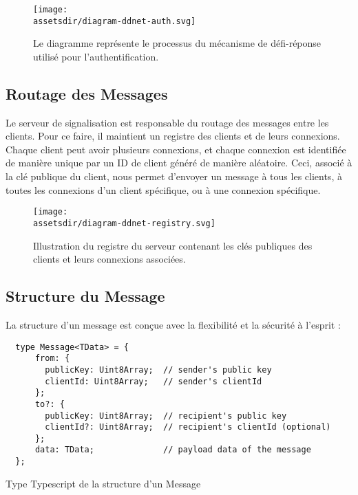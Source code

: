 \begin{figure}[H]
  \begin{center}
      \texttt{[image: \\assetsdir/diagram-ddnet-auth.svg]} %
  \end{center}
  \caption[Mécanisme de Défi-Réponse]{Le diagramme représente le processus du mécanisme de défi-réponse utilisé pour l'authentification.}
\end{figure}

\subsection{Routage des Messages}

Le serveur de signalisation est responsable du routage des messages entre les clients. Pour ce faire, il maintient un registre des clients et de leurs connexions. Chaque client peut avoir plusieurs connexions, et chaque connexion est identifiée de manière unique par un ID de client généré de manière aléatoire. Ceci, associé à la clé publique du client, nous permet d'envoyer un message à tous les clients, à toutes les connexions d'un client spécifique, ou à une connexion spécifique.

\begin{figure}[H]
  \begin{center}
    \texttt{[image: \\assetsdir/diagram-ddnet-registry.svg]}
  \end{center}
  \caption[Registre et Connexions]{Illustration du registre du serveur contenant les clés publiques des clients et leurs connexions associées.}
\end{figure}

\subsection{Structure du Message}

La structure d'un message est conçue avec la flexibilité et la sécurité à l'esprit :

\begin{listing}[H]
  \begin{verbatim}
  type Message<TData> = {
      from: {
        publicKey: Uint8Array;  // sender's public key
        clientId: Uint8Array;   // sender's clientId
      };
      to?: {
        publicKey: Uint8Array;  // recipient's public key
        clientId?: Uint8Array;  // recipient's clientId (optional)
      };
      data: TData;              // payload data of the message
  };
  \end{verbatim}
  \caption{Type Typescript de la structure d'un Message} 
  \end{listing}

